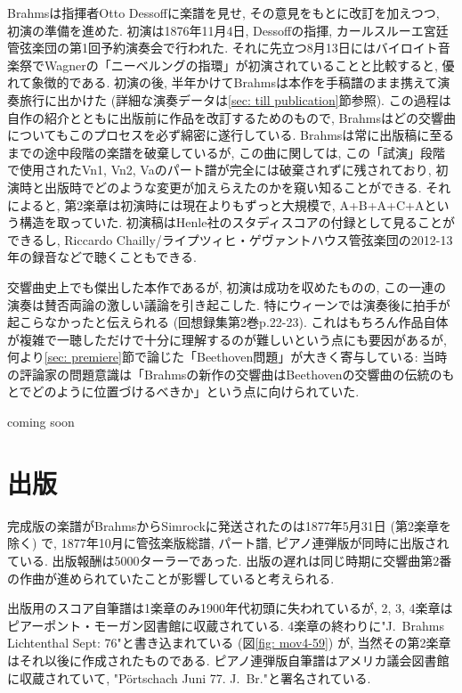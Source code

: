 Brahmsは指揮者Otto Dessoffに楽譜を見せ, その意見をもとに改訂を加えつつ, 初演の準備を進めた.
初演は1876年11月4日, Dessoffの指揮, カールスルーエ宮廷管弦楽団の第1回予約演奏会で行われた.
それに先立つ8月13日にはバイロイト音楽祭でWagnerの「ニーベルングの指環」が初演されていることと比較すると, 優れて象徴的である.
初演の後, 半年かけてBrahmsは本作を手稿譜のまま携えて演奏旅行に出かけた (詳細な演奏データは\ref{sec: till publication}節参照).
この過程は自作の紹介とともに出版前に作品を改訂するためのもので, Brahmsはどの交響曲についてもこのプロセスを必ず綿密に遂行している.
Brahmsは常に出版稿に至るまでの途中段階の楽譜を破棄しているが, この曲に関しては,
この「試演」段階で使用されたVn1, Vn2, Vaのパート譜が完全には破棄されずに残されており, 初演時と出版時でどのような変更が加えらえたのかを窺い知ることができる.
それによると, 第2楽章は初演時には現在よりもずっと大規模で, A+B+A+C+Aという構造を取っていた.
初演稿はHenle社のスタディスコアの付録として見ることができる\cite{henle}し, Riccardo Chailly/ライプツィヒ・ゲヴァントハウス管弦楽団の2012-13年の録音などで聴くこともできる.

交響曲史上でも傑出した本作であるが, 初演は成功を収めたものの, この一連の演奏は賛否両論の激しい議論を引き起こした\cite{compos}.
特にウィーンでは演奏後に拍手が起こらなかったと伝えられる (回想録集\cite{kaisouroku}第2巻p.22-23).
これはもちろん作品自体が複雑で一聴しただけで十分に理解するのが難しいという点にも要因があるが, 何より\ref{sec: premiere}節で論じた「Beethoven問題」が大きく寄与している:
当時の評論家の問題意識は「Brahmsの新作の交響曲はBeethovenの交響曲の伝統のもとでどのように位置づけるべきか」という点に向けられていた\cite{frisch}.

coming soon


\section{出版}

完成版の楽譜がBrahmsからSimrockに発送されたのは1877年5月31日 (第2楽章を除く) で\cite{library},
1877年10月に管弦楽版総譜, パート譜, ピアノ連弾版が同時に出版されている\cite{frisch}. 出版報酬は5000ターラーであった\cite{henle}.
出版の遅れは同じ時期に交響曲第2番の作曲が進められていたことが影響していると考えられる.

出版用のスコア自筆譜は1楽章のみ1900年代初頭に失われているが, 2, 3, 4楽章はピアーポント・モーガン図書館に収蔵されている.
4楽章の終わりに"J.~Brahms Lichtenthal Sept: 76"と書き込まれている (図\ref{fig: mov4-59}) が, 当然その第2楽章はそれ以後に作成されたものである.
ピアノ連弾版自筆譜はアメリカ議会図書館に収蔵されていて, "Pörtschach Juni 77. J.~Br."と署名されている\cite{frisch}.

